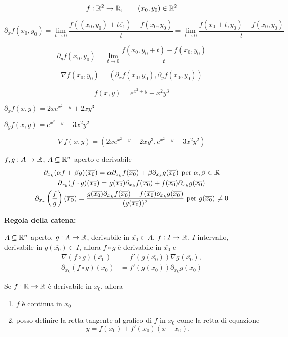 \begin{exbar}
	$$f:\mathbb{R}^2\rightarrow\mathbb{R}, \qquad (x_0,y_0)\in\mathbb{R}^2$$
	
	$$\partial_xf(x_0,y_0)=\lim_{t\rightarrow0}\frac{f((x_0,y_0)+t\overline{e_1})-f(x_0,y_0)}{t}=\lim_{t\rightarrow0}\frac{f(x_0+t,y_0)-f(x_0,y_0)}{t}$$
	
	\segnaposto %
	
	$$\partial_y f(x_0,y_0)=\lim_{t \rightarrow 0}\frac{f(x_0,y_0+t)-f(x_0,y_0)}{t}$$
	
	$$\nabla f(x_0,y_0)=(\partial_xf(x_0,y_0),\partial_yf(x_0,y_0))$$
	
	$$f(x,y)=e^{x^2+y}+x^2y^3$$
	
	$\partial_xf(x,y)=2xe^{x^2+y}+2xy^3$
	
	$\partial_yf(x,y)=e^{x^2+y}+3x^2y^2$
	
	$$\nabla f(x,y)=(2xe^{x^2+y}+2xy^3,e^{x^2+y}+3x^2y^2)$$
\end{exbar}


\begin{attbar}
	$f,g:A\rightarrow\mathbb{R}$, $A\subseteq\mathbb{R}^n$ aperto e derivabile
	\begin{gather*}
		\partial_{x_k}(\alpha f+\beta g)(\overline{x_0})=\alpha\partial_{x_k}f(\overline{x_0})+\beta\partial_{x_k}g(\overline{x_0}) \text{  per  }   \alpha,\beta\in\mathbb{R}
		\\
		\partial_{x_k}(f\cdot g)(\overline{x_0})=g(\overline{x_0})\partial_{x_k}f(\overline{x_0})+f(\overline{x_0})\partial_{x_k}g(\overline{x_0})
		\\
		\partial_{x_k}\left(\frac{f}{g}\right)(\overline{x_0})=\frac{g(\overline{x_0})\partial_{x_k}f(\overline{x_0})-f(\overline{x_0})\partial_{x_k}g(\overline{x_0})}{(g(\overline{x_0}))^2} \text{  per  } g(\overline{x_0})\neq 0
	\end{gather*}
\end{attbar}


\begin{attbar}
	\textbf{Regola della catena:}
	
	$A\subseteq \mathbb{R}^n$ aperto, $g:A\rightarrow \mathbb{R}$, derivabile in $\overline{x_0}\in A$, $f:I\rightarrow\mathbb{R}$, $I$ intervallo, derivabile in $g(\overline{x_0})\in I$, allora $f\circ g$ è derivabile in $\overline{x_0}$ e 
	\begin{align*}
		\nabla(f \circ g)(\overline{x_0})&=f'(g(\overline{x_0}))\nabla g(\overline{x_0}),\\
		\partial_{x_k}(f\circ g)(\overline{x_0})&=f'(g(\overline{x_0}))\partial_{x_k}g(\overline{x_0})
	\end{align*}
	
	Se $f:\mathbb{R}\rightarrow\mathbb{R}$ è derivabile in $x_0$, allora
	\begin{enumerate}
		\item $f$ è continua in $x_0$
		\item posso definire la retta tangente al grafico di $f$ in $x_0$ come la retta di equazione
		\begin{equation*}
			y=f(x_0)+f'(x_0)(x-x_0).
		\end{equation*}
	\end{enumerate}
\end{attbar}


